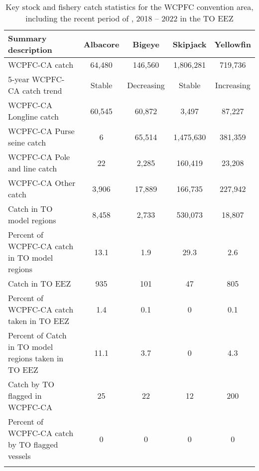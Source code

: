 \begin{longtable}{lcccc}
\caption{Key stock and fishery catch statistics for the WCPFC convention area, including the recent period of , 2018 -- 2022 in the TO EEZ} \\ 
  \hline
Summary description & Albacore & Bigeye & Skipjack & Yellowfin \\ 
  \hline
WCPFC-CA catch & 64,480 & 146,560 & 1,806,281 & 719,736 \\ 
  5-year WCPFC-CA catch trend & Stable & Decreasing & Stable & Increasing \\ 
  WCPFC-CA Longline catch & 60,545 & 60,872 & 3,497 & 87,227 \\ 
  WCPFC-CA Purse seine catch & 6 & 65,514 & 1,475,630 & 381,359 \\ 
  WCPFC-CA Pole and line catch & 22 & 2,285 & 160,419 & 23,208 \\ 
  WCPFC-CA Other catch & 3,906 & 17,889 & 166,735 & 227,942 \\ 
  Catch in TO model regions & 8,458 & 2,733 & 530,073 & 18,807 \\ 
  Percent of WCPFC-CA catch in TO model regions & 13.1 & 1.9 & 29.3 & 2.6 \\ 
   \hline
Catch in TO EEZ & 935 & 101 & 47 & 805 \\ 
  Percent of WCPFC-CA catch taken in TO EEZ & 1.4 & 0.1 & 0 & 0.1 \\ 
  Percent of Catch in TO model regions taken in TO EEZ & 11.1 & 3.7 & 0 & 4.3 \\ 
  Catch by TO flagged in WCPFC-CA & 25 & 22 & 12 & 200 \\ 
  Percent of WCPFC-CA catch by TO flagged vessels & 0 & 0 & 0 & 0 \\ 
  \hline
\label{cat_sum_tab}
\end{longtable}
